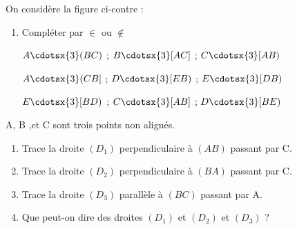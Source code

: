 \documentclass[a4paper,12pt]{article}
\begin{document}
\devoir[ds=true,num=2 ,niv=1 , date=12/12/2022 ]

\begin{exo}[5]
\begin{minipage}{.6\linewidth}
On considère la figure ci-contre :
\begin{enumerate}
\item Compléter par $\in$ ou $\notin$

$A\cdotsx{3} (BC)$ ; $B\cdotsx{3} [AC]$ ; $C\cdotsx{3} [AB)$

$A\cdotsx{3} (CB]$ ; $D\cdotsx{3} [EB)$ ; $E\cdotsx{3} [DB)$

$E\cdotsx{3} [BD)$ ; $C\cdotsx{3} [AB]$ ; $D\cdotsx{3} [BE)$
\end{enumerate}
\end{minipage}%
\begin{minipage}{.4\linewidth}
\end{minipage}
\end{exo}

\begin{exo}[4]
\begin{minipage}{.66\linewidth}
A, B ,et C sont trois points non alignés. 
\begin{enumerate}
\item Trace la droite $(D_{1})$ perpendiculaire à $(AB)$ passant par C.
\item Trace la droite $(D_{2})$ perpendiculaire à $(BA)$ passant par C.
\item Trace la droite $(D_{3})$ parallèle à $(BC)$ passant par A.
\item Que peut-on dire des droites $(D_{1})$ et $(D_{2})$ et $(D_{3})$ ? 
\end{enumerate}
\end{minipage}
\begin{minipage}{.33\linewidth}
\end{minipage}%

\anserline[2]
\end{exo}
\end{document}
